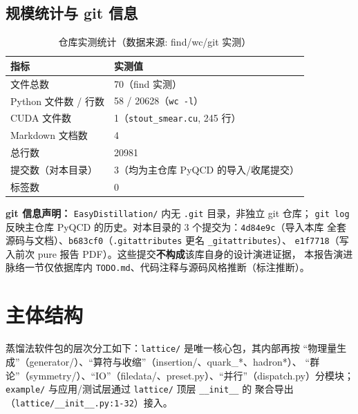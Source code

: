 \documentclass[UTF8]{ctexart}
\begin{document}
\subsection{规模统计与 git 信息}
\begin{table}[htbp]\centering
\begin{tabular}{ll}
\toprule
指标 & 实测值 \\
\midrule
文件总数 & 70（find 实测） \\
Python 文件数 / 行数 & 58 / 20628（\texttt{wc -l}） \\
CUDA 文件数 & 1（\texttt{stout\_smear.cu}, 245 行） \\
Markdown 文档数 & 4 \\
总行数 & 20981 \\
提交数（对本目录） & 3（均为主仓库 PyQCD 的导入/收尾提交） \\
标签数 & 0 \\
\bottomrule
\end{tabular}
\caption{仓库实测统计（数据来源: find/wc/git 实测）}
\end{table}

\begin{warnbox}
\textbf{git 信息声明：} \texttt{EasyDistillation/} 内无 \texttt{.git} 目录，非独立 git 仓库；
\texttt{git log} 反映主仓库 PyQCD 的历史。对本目录的 3 个提交为：\texttt{4d84e9c}（导入本库
全套源码与文档）、\texttt{b683cf0}（\texttt{.gitattributes} 更名 \texttt{\_gitattributes}）、
\texttt{e1f7718}（写入前次 pure 报告 PDF）。这些提交\textbf{不构成}该库自身的设计演进证据，
本报告演进脉络一节仅依据库内 \texttt{TODO.md}、代码注释与源码风格推断（标注\textcolor{warn}{推断}）。
\end{warnbox}

\section{主体结构}

蒸馏法软件包的层次分工如下：\texttt{lattice/} 是唯一核心包，其内部再按
``物理量生成''（generator/）、``算符与收缩''（insertion/、quark\_*、hadron*）、
``群论''（symmetry/）、``IO''（filedata/、preset.py）、``并行''（dispatch.py）分模块；
\texttt{example/} 与应用/测试层通过 \texttt{lattice/} 顶层 \texttt{\_\_init\_\_} 的
聚合导出（\texttt{lattice/\_\_init\_\_.py:1-32}）接入。
\end{document}
